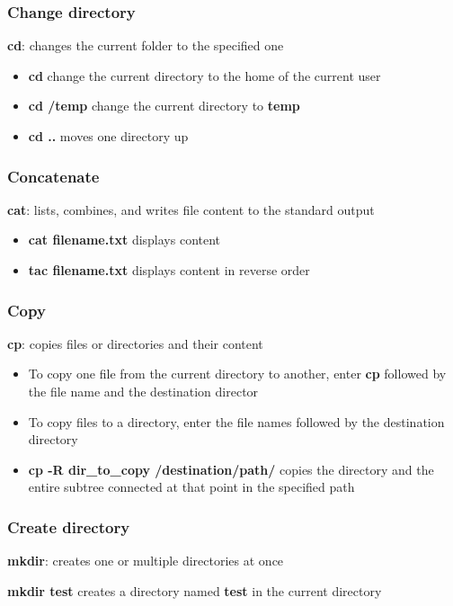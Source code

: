 \documentclass{beamer}
\begin{document}
\begin{frame}
\frametitle{Change directory}
\textbf{cd}: changes the current folder to the specified one
\newline
\begin{example}
\begin{itemize}
\item \textbf{cd} change the current directory to the home of the current user
\item \textbf{cd /temp} change the current directory to \textbf{temp}
\item \textbf{cd ..} moves one directory up
\end{itemize}
\end{example}
\end{frame}

\begin{frame}
\frametitle{Concatenate}
\textbf{cat}: lists, combines, and writes file content to the standard output
\begin{example}
\begin{itemize}
\item \textbf{cat filename.txt} displays content
\item \textbf{tac filename.txt} displays content in reverse order
\end{itemize}
\end{example}
\end{frame}

\begin{frame}
\frametitle{Copy}
\textbf{cp}: copies files or directories and their content
\begin{example}
\begin{itemize}
\item To copy one file from the current directory to another, enter \textbf{cp} followed by the file name and the destination director
\item To copy files to a directory, enter the file names followed by the destination directory
\item \textbf{cp -R dir\_to\_copy /destination/path/} copies the directory and the entire subtree connected at that point in the specified path
\end{itemize}
\end{example}
\end{frame}

\begin{frame}
\frametitle{Create directory}
\textbf{mkdir}: creates one or multiple directories at once
\begin{example}
\textbf{mkdir test} creates a directory named \textbf{test} in the current directory
\end{example}
\end{frame}
\end{document}
